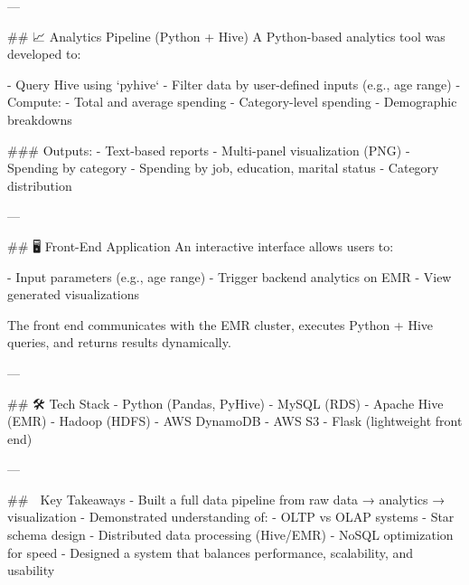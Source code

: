 ---

## 📈 Analytics Pipeline (Python + Hive)
A Python-based analytics tool was developed to:

- Query Hive using `pyhive`
- Filter data by user-defined inputs (e.g., age range)
- Compute:
  - Total and average spending
  - Category-level spending
  - Demographic breakdowns

### Outputs:
- Text-based reports
- Multi-panel visualization (PNG)
  - Spending by category
  - Spending by job, education, marital status
  - Category distribution

---

## 🖥️ Front-End Application
An interactive interface allows users to:

- Input parameters (e.g., age range)
- Trigger backend analytics on EMR
- View generated visualizations

The front end communicates with the EMR cluster, executes Python + Hive queries, and returns results dynamically.

---

## 🛠️ Tech Stack
- Python (Pandas, PyHive)
- MySQL (RDS)
- Apache Hive (EMR)
- Hadoop (HDFS)
- AWS DynamoDB
- AWS S3
- Flask (lightweight front end)

---

## 🚀 Key Takeaways
- Built a full data pipeline from raw data → analytics → visualization
- Demonstrated understanding of:
  - OLTP vs OLAP systems
  - Star schema design
  - Distributed data processing (Hive/EMR)
  - NoSQL optimization for speed
- Designed a system that balances performance, scalability, and usability

